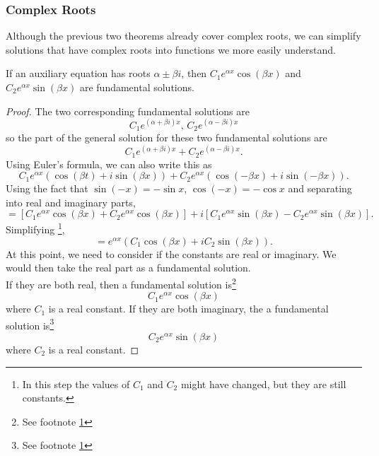 \subsubsection{Complex Roots}
\noindent
Although the previous two theorems already cover complex roots, we can simplify solutions that have complex roots into functions we more easily understand.\\

\begin{theorem}
	If an auxiliary equation has roots $\alpha \pm \beta i$, then $C_1e^{\alpha x}\cos{(\beta x)}$ and  $C_2e^{\alpha x}\sin{(\beta x)}$ are fundamental solutions.
\end{theorem}
\begin{proof}
	The two corresponding fundamental solutions are
	\begin{equation*}
		C_1e^{(\alpha + \beta i)x} \text{, } C_2e^{(\alpha - \beta i)x}
	\end{equation*}
	so the part of the general solution for these two fundamental solutions are
	\begin{equation*}
		C_1e^{(\alpha + \beta i)x} + C_2e^{(\alpha - \beta i)x}.
	\end{equation*}
	Using Euler's formula, we can also write this as
	\begin{equation*}
		C_1 e^{\alpha x}\left( \cos{(\beta t)} + i\sin{(\beta x)} \right) + C_2e^{\alpha x}\left( \cos{(-\beta x)} + i\sin{(-\beta x)} \right).
	\end{equation*}
	Using the fact that $\sin{(-x)} = -\sin{x}$, $\cos{(-x)} = -\cos{x}$ and separating into real and imaginary parts,
	\begin{equation*}
		 = \left[ C_1e^{\alpha x}\cos{(\beta x)} + C_2e^{\alpha x}\cos{(\beta x)} \right] + i\left[ C_1e^{\alpha x}\sin{(\beta x)} - C_2e^{\alpha x}\sin{(\beta x)} \right].
	\end{equation*}
	Simplifying \footnote{\label{note1}In this step the values of $C_1$ and $C_2$ might have changed, but they are still constants.},
	\begin{equation*}
		= e^{\alpha x}\left(C_1\cos{(\beta x)} + iC_2\sin{(\beta x)}\right).
	\end{equation*}
	At this point, we need to consider if the constants are real or imaginary.
	We would then take the real part as a fundamental solution.\\
	If they are both real, then a fundamental solution is\footnote{See footnote \ref{note1}}
	\begin{equation*}
		C_1e^{\alpha x}\cos{(\beta x)}
	\end{equation*}
	where $C_1$ is a real constant.
	If they are both imaginary, the a fundamental solution is\footnote{See footnote \ref{note1}}
	\begin{equation*}
		C_2e^{\alpha x}\sin{(\beta x)}
	\end{equation*}
	where $C_2$ is a real constant.
\end{proof}

